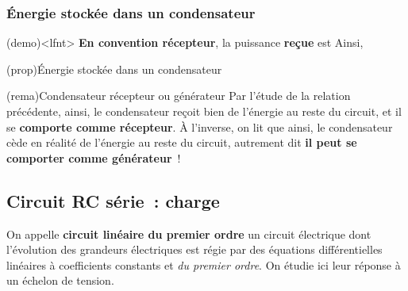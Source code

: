 \documentclass[../../main/main.tex]{subfiles}
\begin{document}
\subsubsection{Énergie stockée dans un condensateur}
\begin{tcb}(demo)<lfnt>{}
	\textbf{En convention récepteur}, la puissance \textbf{reçue} est
	\vspace{-15pt}
	{}
	\smallbreak
	Ainsi,
	\psw{
		\[
			\Pc_{C} = \dv{t} \left( \frac{1}{2} Cu_C{}^2 \right)
			\Rightarrow \Ec_C(t) = \frac{1}{2}C u_C(t)^2
		\]
	}
	\vspace{-15pt}
\end{tcb}

\begin{tcb}[label=prop:Ec](prop){Énergie stockée dans un condensateur}
	\psw{
	\[
		\boxed{\Ec_C(t) = \frac{1}{2}C u_C{}^2(t)}
	\]
	}
	\vspace{-10pt}
\end{tcb}
\begin{tcb}[label=rema:genrec, sidebyside](rema){Condensateur récepteur ou
			générateur}
	Par l'étude de la relation précédente,
	ainsi, le condensateur reçoit bien de l'énergie au reste du circuit, et il se
	\textbf{comporte comme récepteur}.
	\tcblower
	À l'inverse, on lit que
	ainsi, le condensateur cède en réalité de l'énergie au reste du circuit,
	autrement dit \textbf{il peut se comporter comme générateur}~!
\end{tcb}

\subsection{Circuit RC série~: charge}

On appelle \textbf{circuit linéaire du premier ordre} un circuit électrique
dont l'évolution des grandeurs électriques est régie par des équations
différentielles linéaires à coefficients constants et \textit{du premier
	ordre}. On étudie ici leur réponse à un échelon de tension.
\end{document}
